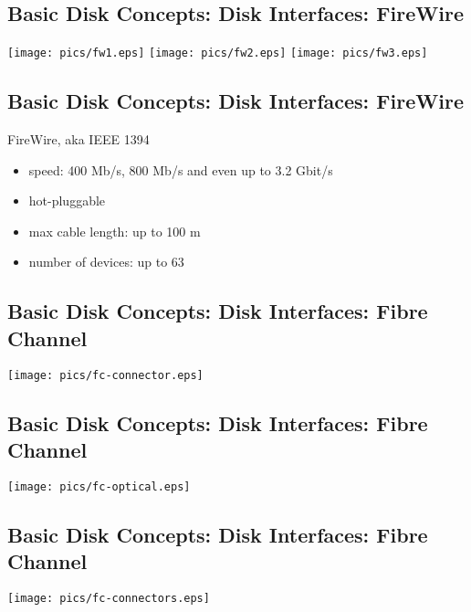 \documentclass[xga]{xdvislides}
\begin{document}
\subsection{Basic Disk Concepts: Disk Interfaces: FireWire}
\vfill
	\begin{center}
		\texttt{[image: pics/fw1.eps]}
		\texttt{[image: pics/fw2.eps]}
		\texttt{[image: pics/fw3.eps]}
	\end{center}
\vfill

\subsection{Basic Disk Concepts: Disk Interfaces: FireWire}
FireWire, aka IEEE 1394
\begin{itemize}
	\item speed: 400 Mb/s, 800 Mb/s and even up to 3.2 Gbit/s
	\item hot-pluggable
	\item max cable length: up to 100 m
	\item number of devices: up to 63
\end{itemize}
\newpage


\subsection{Basic Disk Concepts: Disk Interfaces: Fibre Channel}
\vfill
	\begin{center}
		\texttt{[image: pics/fc-connector.eps]} \\
	\end{center}
\vfill

\subsection{Basic Disk Concepts: Disk Interfaces: Fibre Channel}
\vfill
	\begin{center}
		\texttt{[image: pics/fc-optical.eps]} \\
	\end{center}
\vfill

\subsection{Basic Disk Concepts: Disk Interfaces: Fibre Channel}
\vfill
	\begin{center}
		\texttt{[image: pics/fc-connectors.eps]} \\
	\end{center}
\vfill
\end{document}
